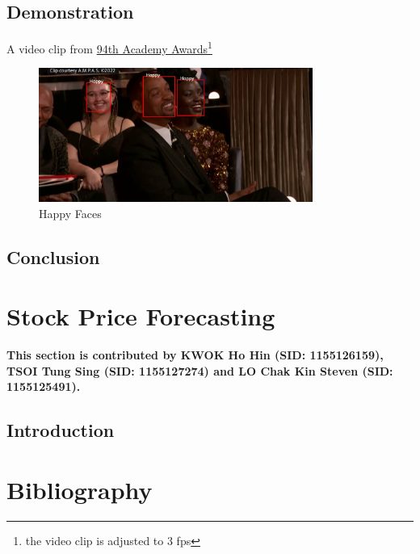 \documentclass[11pt,a4paper]{article}
\begin{document}
    \newpage
    \subsection{Demonstration}
    A video clip from \href{https://www.youtube.com/watch?v=myjEoDypUD8&pbjreload=102}{94th Academy Awards}\footnote{the video clip is adjusted to 3 fps}
    \begin{figure}[H]
        \centering
        \includegraphics[width = 0.8\textwidth]{written_report/pictures/happy.png}
        \caption{Happy Faces}
        \label{fig:happy}
    \end{figure}
    
    \subsection{Conclusion}
    
    \newpage
    \section{Stock Price Forecasting}
    \textbf{This section is contributed by KWOK Ho Hin (SID: 1155126159), TSOI Tung Sing (SID: 1155127274) and LO Chak Kin Steven (SID: 1155125491).}
    
    \subsection{Introduction}
    
    
    \newpage
    \section{Bibliography}
    
    
\end{document}
